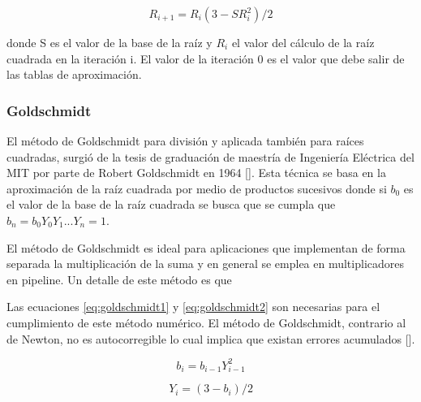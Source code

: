 \begin{equation}
\label{eq:newton_raphson_square_root}
  R_{i+1}=R_{i}(3-SR_{i}^{2})/2
\end{equation}

donde S es el valor de la base de la raíz y $R_{i}$ el valor del cálculo de la raíz cuadrada en la iteración i. El valor de la iteración 0 es el valor que debe salir de las tablas de aproximación.


\subsubsection{Goldschmidt}

El método de Goldschmidt para división y aplicada también para raíces cuadradas, surgió de la tesis de graduación de maestría de Ingeniería Eléctrica del MIT por parte de Robert Goldschmidt en 1964 [\cite{Goldschmidt1964}]. Esta técnica se basa en la aproximación de la raíz cuadrada por medio de productos sucesivos donde si $b_{0}$ es el valor de la base de la raíz cuadrada se busca que se cumpla que $b_{n}=b_{0}Y_{0}Y_{1}...Y_{n}=1$.

El método de Goldschmidt es ideal para aplicaciones que implementan de forma separada la multiplicación de la suma y en general se emplea en multiplicadores en pipeline. Un detalle de este método es que 

Las ecuaciones \eqref{eq:goldschmidt1} y \eqref{eq:goldschmidt2} son necesarias para el cumplimiento de este método numérico. El método de Goldschmidt, contrario al de Newton, no es autocorregible lo cual implica que existan errores acumulados [\cite{Markstein2004}].

\begin{equation}
\label{eq:goldschmidt1}
  b_{i}=b_{i-1}Y_{i-1}^{2}
\end{equation}

\begin{equation}
\label{eq:goldschmidt2}
  Y_{i}=(3-b_{i})/2
\end{equation}
  




